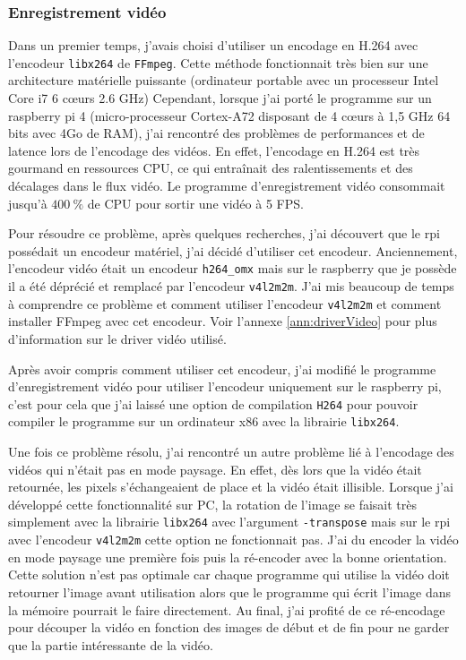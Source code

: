 \documentclass[a4paper, 11pt, french]{article}
\begin{document}

\subsubsection{Enregistrement vidéo}

Dans un premier temps, j'avais choisi d'utiliser un encodage en H.264 avec l'encodeur \texttt{libx264} de \texttt{FFmpeg}. Cette méthode fonctionnait très bien sur une architecture matérielle puissante (ordinateur portable avec un processeur Intel Core i7 6 c\oe urs  2.6 GHz) Cependant, lorsque j'ai porté le programme sur un raspberry pi 4 (micro-processeur Cortex-A72 disposant de 4 c\oe urs à 1,5 GHz 64 bits avec 4Go de RAM), j'ai rencontré des problèmes de performances et de latence lors de l'encodage des vidéos. En effet, l'encodage en H.264 est très gourmand en ressources CPU, ce qui entraînait des ralentissements et des décalages dans le flux vidéo. Le programme d'enregistrement vidéo consommait jusqu'à \(400\ \%\) de CPU pour sortir une vidéo à 5 FPS.

Pour résoudre ce problème, après quelques recherches, j'ai découvert que le rpi possédait un encodeur matériel, j'ai décidé d'utiliser cet encodeur. Anciennement, l'encodeur vidéo était un encodeur \texttt{h264\_omx} mais sur le raspberry que je possède il a été déprécié et remplacé  par l'encodeur \texttt{v4l2m2m}. J'ai mis beaucoup de temps à comprendre ce problème et comment utiliser l'encodeur \texttt{v4l2m2m} et comment installer FFmpeg avec cet encodeur. Voir l'annexe \ref{ann:driverVideo} pour plus d'information sur le driver vidéo utilisé.

Après avoir compris comment utiliser cet encodeur, j'ai modifié le programme d'enregistrement vidéo pour utiliser l'encodeur uniquement sur le raspberry pi, c'est pour cela que j'ai laissé une option de compilation \texttt{H264} pour pouvoir compiler le programme sur un ordinateur x86 avec la librairie \texttt{libx264}.


Une fois ce problème résolu, j'ai rencontré un autre problème lié à l'encodage des vidéos qui n'était pas en mode paysage. En effet, dès lors que la vidéo était retournée, les pixels s'échangeaient de place et la vidéo était illisible. Lorsque j'ai développé cette fonctionnalité sur PC, la rotation de l'image se faisait très simplement avec la librairie \texttt{libx264} avec l'argument \texttt{-transpose} mais sur le rpi avec l'encodeur \texttt{v4l2m2m} cette option ne fonctionnait pas. J'ai du encoder la vidéo en mode paysage une première fois puis la ré-encoder avec la bonne orientation. Cette solution n'est pas optimale car chaque programme qui utilise la vidéo doit retourner l'image avant utilisation alors que le programme qui écrit l'image dans la mémoire pourrait le faire directement. Au final, j'ai profité de ce ré-encodage pour découper la vidéo en fonction des images de début et de fin pour ne garder que la partie intéressante de la vidéo.
\end{document}
